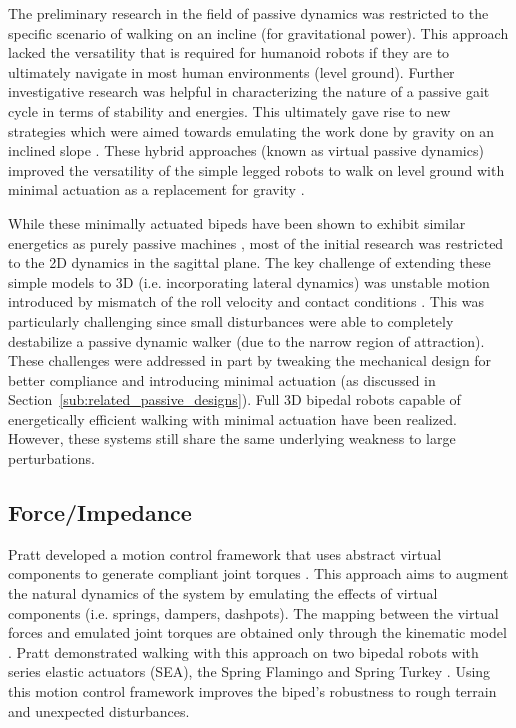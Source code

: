 The preliminary research in the field of passive dynamics was restricted to the specific scenario of walking on an incline (for gravitational power). This approach lacked the versatility that is required for humanoid robots if they are to ultimately navigate in most human environments (level ground). Further investigative research was helpful in characterizing the nature of a passive gait cycle \cite{Goswami:1996gn} in terms of stability and energies. This ultimately gave rise to new strategies which were aimed towards emulating the work done by gravity on an inclined slope \cite{Asano:2000wi}. These hybrid approaches (known as virtual passive dynamics) improved the versatility of the simple legged robots to walk on level ground with minimal actuation as a replacement for gravity \cite{Asano:2004tv}. 

While these minimally actuated bipeds have been shown to exhibit similar energetics as purely passive machines \cite{Asano:2004jp}, most of the initial research was restricted to the 2D dynamics in the sagittal plane. The key challenge of extending these simple models to 3D (i.e. incorporating lateral dynamics) was unstable motion introduced by mismatch of the roll velocity and contact conditions \cite{Kuo:1999tn}. This was particularly challenging since small disturbances were able to completely destabilize a passive dynamic walker (due to the narrow region of attraction). These challenges were addressed in part by tweaking the mechanical design for better compliance and introducing minimal actuation (as discussed in Section~\ref{sub:related_passive_designs}). Full 3D bipedal robots capable of energetically efficient walking with minimal actuation have been realized. However, these systems still share the same underlying weakness to large perturbations. 


\subsection{Force/Impedance} %
\label{sub:related_force_impedance}
Pratt developed a motion control framework that uses abstract virtual components to generate compliant joint torques \cite{Pratt:1995ww}. This approach aims to augment the natural dynamics of the system by emulating the effects of virtual components (i.e. springs, dampers, dashpots). The mapping between the virtual forces and emulated joint torques are obtained only through the kinematic model \cite{Pratt:1998cf}. Pratt demonstrated walking with this approach on two bipedal robots with series elastic actuators (SEA), the Spring Flamingo and Spring Turkey \cite{Pratt:2001vu}. Using this motion control framework improves the biped's robustness to rough terrain and unexpected disturbances.

